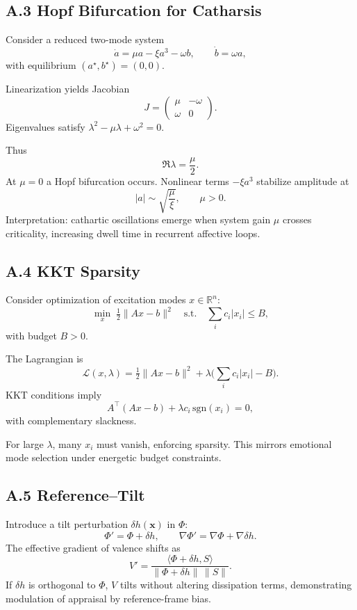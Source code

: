 \documentclass[11pt]{article}
\theoremstyle{plain}
\begin{document}
\subsection*{A.3 Hopf Bifurcation for Catharsis}

Consider a reduced two-mode system
\[
\dot{a} = \mu a - \xi a^3 - \omega b, \qquad \dot{b} = \omega a,
\]
with equilibrium $(a^\star,b^\star)=(0,0)$.  

Linearization yields Jacobian
\[
J = \begin{pmatrix} \mu & -\omega \\ \omega & 0 \end{pmatrix}.
\]
Eigenvalues satisfy $\lambda^2 - \mu \lambda + \omega^2 = 0$.  

Thus
\[
\Re \lambda = \frac{\mu}{2}.
\]
At $\mu = 0$ a Hopf bifurcation occurs. Nonlinear terms $- \xi a^3$ stabilize amplitude at
\[
|a| \sim \sqrt{\frac{\mu}{\xi}}, \qquad \mu > 0.
\]
Interpretation: cathartic oscillations emerge when system gain $\mu$ crosses criticality, increasing dwell time in recurrent affective loops.

\subsection*{A.4 KKT Sparsity}

Consider optimization of excitation modes $x\in\mathbb{R}^n$:
\[
\min_{x} \; \tfrac{1}{2}\|Ax-b\|^2 \quad \text{s.t.} \quad \sum_i c_i |x_i| \leq B,
\]
with budget $B>0$.  

The Lagrangian is
\[
\mathcal{L}(x,\lambda) = \tfrac{1}{2}\|Ax-b\|^2 + \lambda\Big(\sum_i c_i |x_i|-B\Big).
\]
KKT conditions imply
\[
A^\top (Ax-b) + \lambda c_i \, \mathrm{sgn}(x_i)=0,
\]
with complementary slackness.  

For large $\lambda$, many $x_i$ must vanish, enforcing sparsity. This mirrors emotional mode selection under energetic budget constraints.

\subsection*{A.5 Reference--Tilt}

Introduce a tilt perturbation $\delta h(\mathbf{x})$ in $\Phi$:
\[
\Phi' = \Phi + \delta h, \qquad \nabla \Phi' = \nabla \Phi + \nabla \delta h.
\]
The effective gradient of valence shifts as
\[
V' = \frac{\langle \Phi+\delta h, S \rangle}{\|\Phi+\delta h\|\,\|S\|}.
\]
If $\delta h$ is orthogonal to $\Phi$, $V$ tilts without altering dissipation terms, demonstrating modulation of appraisal by reference-frame bias.
\end{document}
